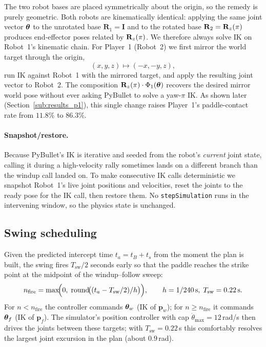 The two robot bases are placed symmetrically about the origin, so the
remedy is purely geometric. Both robots are kinematically identical:
applying the same joint vector $\boldsymbol{\theta}$ to the unrotated base
$\mathbf{R}_{1}=\mathbf{I}$ and to the rotated base
$\mathbf{R}_{2}=\mathbf{R}_{z}(\pi)$ produces end-effector poses related by
$\mathbf{R}_{z}(\pi)$. We therefore always solve IK on Robot~1's kinematic
chain. For Player~1 (Robot~2) we first mirror the world target through
the origin,
\begin{equation}
  (x,y,z)\longmapsto(-x,-y,z),
  \label{eq:mirror}
\end{equation}
run IK against Robot~1 with the mirrored target, and apply the resulting
joint vector to Robot~2. The composition
$\mathbf{R}_{z}(\pi)\cdot\Phi_{1}(\boldsymbol{\theta})$ recovers the desired mirror world pose
without ever asking PyBullet to solve a yaw-$\pi$ IK. As shown later
(Section~\ref{sub:results_p1}), this single change raises Player~1's
paddle-contact rate from $11.8\%$ to $86.3\%$.

\paragraph{Snapshot/restore.}
Because PyBullet's IK is iterative and seeded from the robot's
\emph{current} joint state, calling it during a high-velocity rally
sometimes lands on a different branch than the windup call landed on.
To make consecutive IK calls deterministic we snapshot Robot~1's live
joint positions and velocities, reset the joints to the ready pose for
the IK call, then restore them. No \texttt{stepSimulation} runs in the
intervening window, so the physics state is unchanged.

\subsection{Swing scheduling}
\label{sub:sched}

Given the predicted intercept time $t_{a}=t_{B}+t_{s}$ from the moment
the plan is built, the swing fires
$T_{\mathrm{sw}}/2$ seconds early so that the paddle reaches the strike
point at the midpoint of the windup--follow sweep:
\begin{equation}
  n_{\mathrm{fire}}=\max\!\Bigl(0,\;
   \mathrm{round}\!\bigl((t_{a}-T_{\mathrm{sw}}/2)/h\bigr)\Bigr),
  \qquad h=1/240\,\mathrm{s},\;T_{\mathrm{sw}}=0.22\,\mathrm{s}.
\end{equation}
For $n<n_{\mathrm{fire}}$ the controller commands $\boldsymbol{\theta}_{w}$
(IK of $\mathbf{p}_{w}$); for $n\ge n_{\mathrm{fire}}$ it commands
$\boldsymbol{\theta}_{f}$ (IK of $\mathbf{p}_{f}$). The simulator's position controller
with cap $\dot{\theta}_{\max}=12$\,rad/s then drives the joints between
these targets; with $T_{\mathrm{sw}}=0.22$\,s this comfortably resolves
the largest joint excursion in the plan (about $0.9$\,rad).

